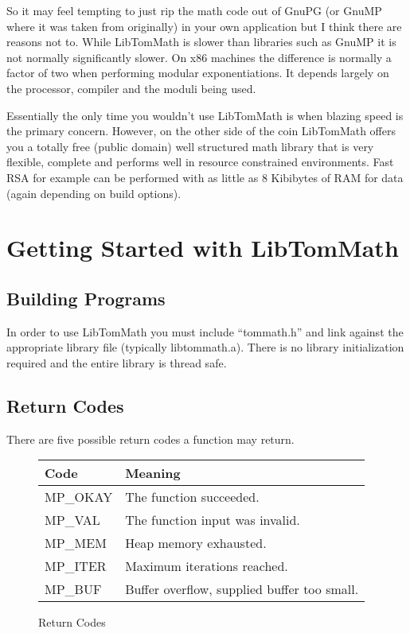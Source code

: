 \documentclass[synpaper]{book}
\begin{document}
So it may feel tempting to just rip the math code out of GnuPG (or GnuMP where it was taken from
originally) in your own application but I think there are reasons not to.  While LibTomMath is
slower than libraries such as GnuMP it is not normally significantly slower.  On x86 machines the
difference is normally a factor of two when performing modular exponentiations.  It depends largely
on the processor, compiler and the moduli being used.

Essentially the only time you wouldn't use LibTomMath is when blazing speed is the primary concern.
However, on the other side of the coin LibTomMath offers you a totally free (public domain) well
structured math library that is very flexible, complete and performs well in resource constrained
environments.  Fast RSA for example can be performed with as little as 8 Kibibytes of RAM for data
(again depending on build options).

\chapter{Getting Started with LibTomMath}
\section{Building Programs}
In order to use LibTomMath you must include ``tommath.h'' and link against the appropriate library
file (typically
libtommath.a).  There is no library initialization required and the entire library is thread safe.

\section{Return Codes}
There are five possible return codes a function may return.

\begin{figure}[h!]
  \begin{center}
    \begin{small}
      \begin{tabular}{|l|l|}
        \hline \textbf{Code} & \textbf{Meaning}                            \\
        \hline MP\_OKAY      & The function succeeded.                     \\
        \hline MP\_VAL       & The function input was invalid.             \\
        \hline MP\_MEM       & Heap memory exhausted.                      \\
        \hline MP\_ITER      & Maximum iterations reached.                 \\
        \hline MP\_BUF       & Buffer overflow, supplied buffer too small. \\
        \hline
      \end{tabular}
    \end{small}
  \end{center}
  \caption{Return Codes}
\end{figure}
\end{document}
